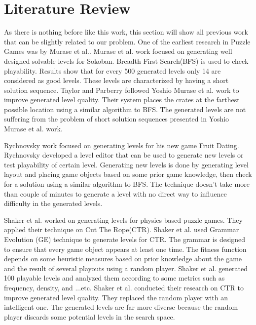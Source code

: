 \documentclass[letterpaper]{article}
\begin{document}
\section{Literature Review}
As there is nothing before like this work, this section will show all previous work that can be slightly related to our problem. One of the earliest research in Puzzle Games was by Murase et al.\cite{sokobanLevelGenerationOld}. Murase et al. work focused on generating well designed solvable levels for Sokoban\cite{sokoban}. Breadth First Search(BFS) is used to check playability. Results show that for every 500 generated levels only 14 are considered as good levels. These levels are characterized by having a short solution sequence. Taylor and Parberry\cite{sokobanLevelGenerationNew} followed Yoshio Murase et al.\cite{sokobanLevelGenerationOld} work to improve generated level quality. Their system places the crates at the farthest possible location using a similar algorithm to BFS. The generated levels are not suffering from the problem of short solution sequences presented in Yoshio Murase et al.\cite{sokobanLevelGenerationOld} work.\\\par

Rychnovsky\cite{fruitDatingPCG} work focused on generating levels for his new game Fruit Dating\cite{fruitDating}. Rychnovsky developed a level editor that can be used to generate new levels or test playability of certain level. Generating new levels is done by generating level layout and placing game objects based on some prior game knowledge, then check for a solution using a similar algorithm to BFS. The technique doesn't take more than couple of minutes to generate a level with no direct way to influence difficulty in the generated levels.\\\par

Shaker et al.\cite{ctrAutomaticGeneration} worked on generating levels for physics based puzzle games. They applied their technique on Cut The Rope(CTR)\cite{cutTheRope}. Shaker et al. used Grammar Evolution (GE) technique to generate levels for CTR. The grammar is designed to ensure that every game object appears at least one time. The fitness function depends on some heuristic measures based on prior knowledge about the game and the result of several playouts using a random player. Shaker et al. generated 100 playable levels and analyzed them according to some metrics such as frequency, density, and ...etc. Shaker et al.\cite{ctrSimulationApproach} conducted their research on CTR to improve generated level quality. They replaced the random player with an intelligent one. The generated levels are far more diverse because the random player discards some potential levels in the search space.\\\par
\end{document}
